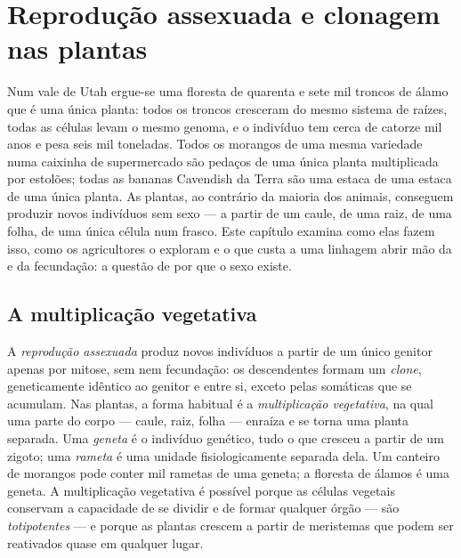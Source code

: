 \chapter{Reprodução assexuada e clonagem nas plantas}\label{ch:b2:asexual-reproduction}

Num vale de Utah ergue-se uma floresta de quarenta e sete mil troncos
de álamo que é uma única planta: todos os troncos cresceram do mesmo
sistema de raízes, todas as células levam o mesmo genoma, e o
indivíduo tem cerca de catorze mil anos e pesa seis mil toneladas.
Todos os morangos de uma mesma variedade numa caixinha de supermercado
são pedaços de uma única planta multiplicada por estolões; todas as
bananas Cavendish da Terra são uma estaca de uma estaca de uma única
planta. As plantas, ao contrário da maioria dos animais, conseguem
produzir novos indivíduos sem sexo --- a partir de um caule, de uma
raiz, de uma folha, de uma única célula num frasco. Este capítulo
examina como elas fazem isso, como os agricultores o exploram e o que
custa a uma linhagem abrir mão da  e da fecundação: a questão de
por que o sexo existe.

\section{A multiplicação vegetativa}

\begin{definition}\label{def:b2:asexual-reproduction:clone}
A \emph{reprodução assexuada} produz novos indivíduos a partir de um
único genitor apenas por mitose, sem  nem fecundação: os
descendentes formam um \emph{clone}, geneticamente idêntico ao genitor
e entre si, exceto pelas  somáticas que se acumulam. Nas
plantas, a forma habitual é a \emph{multiplicação vegetativa}, na qual
uma parte do corpo --- caule, raiz, folha --- enraíza e se torna uma
planta separada. Uma \emph{geneta} é o indivíduo genético, tudo o que
cresceu a partir de um zigoto; uma \emph{rameta} é uma unidade
fisiologicamente separada dela. Um canteiro de morangos pode conter mil
rametas de uma geneta; a floresta de álamos é uma geneta. A
multiplicação vegetativa é possível porque as células vegetais
conservam a capacidade de se dividir e de formar qualquer órgão --- são
\emph{totipotentes} --- e porque as plantas crescem a partir de
meristemas que podem ser reativados quase em qualquer lugar.
\end{definition}


